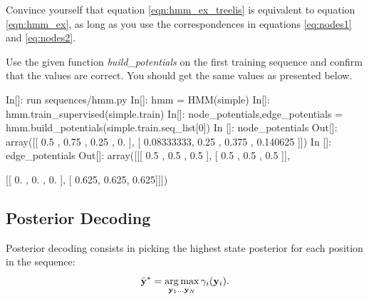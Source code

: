 
\begin{exercise}
Convince yourself that equation \ref{eqn:hmm_ex_treelis} is equivalent to equation \ref{eqn:hmm_ex}, as long as you use the correspondences in equations \eqref{eq:nodes1} and \eqref{eq:nodes2}.

Use the given function \emph{build\_potentials} on the first training sequence and confirm that the values are correct. You should get the same values as presented below.


%

\begin{python}
In[]: run sequences/hmm.py
In[]: hmm = HMM(simple)
In[]: hmm.train_supervised(simple.train)
In[]: node_potentials,edge_potentials = hmm.build_potentials(simple.train.seq_list[0])
In []: node_potentials
Out[]: 
array([[ 0.5       ,  0.75      ,  0.25      ,  0.        ],
       [ 0.08333333,  0.25      ,  0.375     ,  0.140625  ]])
In []: edge_potentials
Out[]: 
array([[[ 0.5  ,  0.5  ,  0.5  ],
        [ 0.5  ,  0.5  ,  0.5  ]],

       [[ 0.   ,  0.   ,  0.   ],
        [ 0.625,  0.625,  0.625]]])
\end{python}
\end{exercise}



\subsection{Posterior Decoding}
Posterior decoding consists
in picking the highest state posterior for each position in the sequence:
\begin{equation}
\bar{\mathbf{y}}^* = \operatorname*{arg\,max}_{\mathbf{y}_1 \ldots \mathbf{y}_N} \gamma_i(\mathbf{y}_i).
\end{equation}

